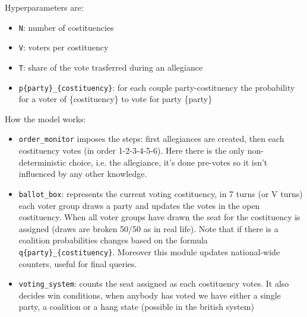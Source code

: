 \documentclass[12pt,a4paper]{article}
\begin{document}
\begin{enumerate}
Hyperparameters are:
\begin{itemize}
    \item \texttt{N}: number of costituencies
    \item \texttt{V}: voters per costituency
    \item \texttt{T}: share of the vote trasferred during an allegiance
    \item \texttt{p\{party\}\_\{costituency\}}: for each couple party-costituency the probability for a voter of \{costituency\} to vote for party \{party\}
\end{itemize}

How the model works:
\begin{itemize}
    \item \texttt{order\_monitor} imposes the steps: first allegiances are created, then each costituency votes (in order 1-2-3-4-5-6). Here there is the only non-deterministic choice, i.e. the allegiance, it's done pre-votes so it isn't influenced by any other knowledge.

    \item \texttt{ballot\_box}: represents the current voting costituency, in 7 turns (or V turns) each voter group draws a party and updates the votes in the open costituency. When all voter groups have drawn the seat for the costituency is assigned (draws are broken 50/50 as in real life). Note that if there is a coalition probabilities changes based on the formula \texttt{q\{party\}\_\{costituency\}}. Moreover this module updates national-wide counters, useful for final queries.

    \item \texttt{voting\_system}: counts the seat assigned as each costituency votes. It also decides win conditions, when anybody has voted we have either a single party, a coalition or a hang state (possible in the british system)
\end{itemize}




\end{enumerate}
\end{document}
